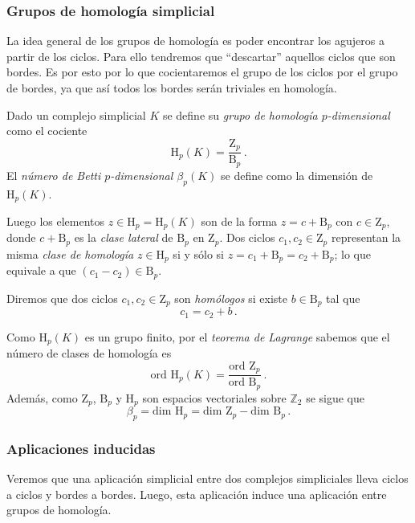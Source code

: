 \subsubsection*{Grupos de homología simplicial}
La idea general de los grupos de homología es poder encontrar los agujeros a partir de los ciclos. Para ello tendremos que ``descartar'' aquellos ciclos que son bordes. Es por esto por lo que cocientaremos el grupo de los ciclos por el grupo de bordes, ya que así todos los bordes serán triviales en homología.

\begin{definition}
Dado un complejo simplicial $K$ se define su \emph{grupo de homología $p$-dimensional} como el cociente
\[
\text{H}_p(K)=\dfrac{\text{Z}_p}{\text{B}_p}\,.
\]
El \emph{número de Betti $p$-dimensional $\beta_p(K)$} se define como la dimensión de $\text{H}_p(K)$. 
\end{definition}

Luego los elementos $z \in \text{H}_p = \text{H}_p(K)$ son de la forma $z = c + \text{B}_p$ con $c \in \text{Z}_p$, donde $c + \text{B}_p$ es la \emph{clase lateral} de $\text{B}_p$ en $\text{Z}_p$. Dos ciclos $c_1, c_2 \in \text{Z}_p$ representan la misma \emph{clase de homología} $z \in \text{H}_p$ si y sólo si $z= c_1 + \text{B}_p = c_2 + \text{B}_p$; lo que equivale a que $(c_1-c_2) \in \text{B}_p$.

\begin{definition}
Diremos que dos ciclos $c_1, c_2 \in \text{Z}_p$ son \emph{homólogos} si existe $b \in \text{B}_p$ tal que 
\[
c_1 = c_2 + b\,.
\]
\end{definition}

Como $\text{H}_p(K)$ es un grupo finito, por el \emph{teorema de Lagrange} sabemos que el número de clases de homología es
\[
\text{ord } \text{H}_p(K) = \dfrac{\text{ord }  \text{Z}_p}{\text{ord } \text{B}_p}\,.
\]
Además, como $\text{Z}_p$, $\text{B}_p$ y $\text{H}_p$ son espacios vectoriales sobre $\mathbb{Z}_2$ se sigue que 
\[
\beta_p = \text{dim } \text{H}_p = \text{dim } \text{Z}_p - \text{dim } \text{B}_p\,.
\] 

\subsubsection*{Aplicaciones inducidas}
Veremos que una aplicación simplicial entre dos complejos simpliciales lleva ciclos a ciclos y bordes a bordes. Luego, esta aplicación induce una aplicación entre grupos de homología.

